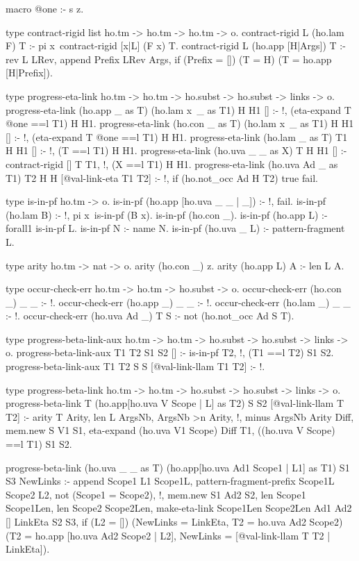 \begin{elpicode}
  
  macro @one :- s z.

  type contract-rigid list ho.tm -> ho.tm -> ho.tm -> o.
  contract-rigid L (ho.lam F) T :- 
    pi x\ contract-rigid [x|L] (F x) T. %
  contract-rigid L (ho.app [H|Args]) T :- 
    rev L LRev, append Prefix LRev Args,
    if (Prefix = []) (T = H) (T = ho.app [H|Prefix]).

  type progress-eta-link ho.tm -> ho.tm -> ho.subst -> ho.subst -> links -> o.
  progress-eta-link (ho.app _ as T) (ho.lam x\ _ as T1) H H1 [] :- !, 
    ({eta-expand T @one} ==l T1) H H1.
  progress-eta-link (ho.con _ as T) (ho.lam x\ _ as T1) H H1 [] :- !, 
    ({eta-expand T @one} ==l T1) H H1.
  progress-eta-link (ho.lam _ as T) T1 H H1 [] :- !, 
    (T ==l T1) H H1.
  progress-eta-link (ho.uva _ _ as X) T H H1 [] :- 
    contract-rigid [] T T1, !, (X ==l T1) H H1.
  progress-eta-link (ho.uva Ad _ as T1) T2 H H [@val-link-eta T1 T2] :- !, 
    if (ho.not_occ Ad H T2) true fail.

  type is-in-pf ho.tm -> o.
  is-in-pf (ho.app [ho.uva _ _ | _]) :- !, fail.
  is-in-pf (ho.lam B) :- !, pi x\ is-in-pf (B x).
  is-in-pf (ho.con _).
  is-in-pf (ho.app L) :- forall1 is-in-pf L.
  is-in-pf N :- name N.
  is-in-pf (ho.uva _ L) :- pattern-fragment L.

  type arity ho.tm -> nat -> o.
  arity (ho.con _) z.
  arity (ho.app L) A :- len L A.

  type occur-check-err ho.tm -> ho.tm -> ho.subst -> o.
  occur-check-err (ho.con _) _ _ :- !.
  occur-check-err (ho.app _) _ _ :- !.
  occur-check-err (ho.lam _) _ _ :- !.
  occur-check-err (ho.uva Ad _) T S :-
    not (ho.not_occ Ad S T).

  type progress-beta-link-aux ho.tm -> ho.tm -> 
          ho.subst -> ho.subst -> links -> o.
  progress-beta-link-aux T1 T2 S1 S2 [] :-  is-in-pf T2, !,
    (T1 ==l T2) S1 S2.
  progress-beta-link-aux T1 T2 S S [@val-link-llam T1 T2] :- !.

  type progress-beta-link ho.tm -> ho.tm -> ho.subst -> 
        ho.subst -> links -> o.
  progress-beta-link T (ho.app[ho.uva V Scope | L] as T2) S S2 [@val-link-llam T T2] :- 
    arity T Arity, len L ArgsNb, ArgsNb >n Arity, !,
    minus ArgsNb Arity Diff, mem.new S V1 S1,
    eta-expand (ho.uva V1 Scope) Diff T1,
    ((ho.uva V Scope) ==l T1) S1 S2.

  progress-beta-link (ho.uva _ _ as T) (ho.app[ho.uva Ad1 Scope1 | L1] as T1) S1 S3 NewLinks :-
    append Scope1 L1 Scope1L,
    pattern-fragment-prefix Scope1L Scope2 L2,
    not (Scope1 = Scope2), !,
    mem.new S1 Ad2 S2,
    len Scope1 Scope1Len,
    len Scope2 Scope2Len,
    make-eta-link Scope1Len Scope2Len Ad1 Ad2 [] LinkEta S2 S3,
    if (L2 = []) (NewLinks = LinkEta, T2 = ho.uva Ad2 Scope2) 
      (T2 = ho.app [ho.uva Ad2 Scope2 | L2], 
      NewLinks = [@val-link-llam T T2 | LinkEta]).


\end{elpicode}
